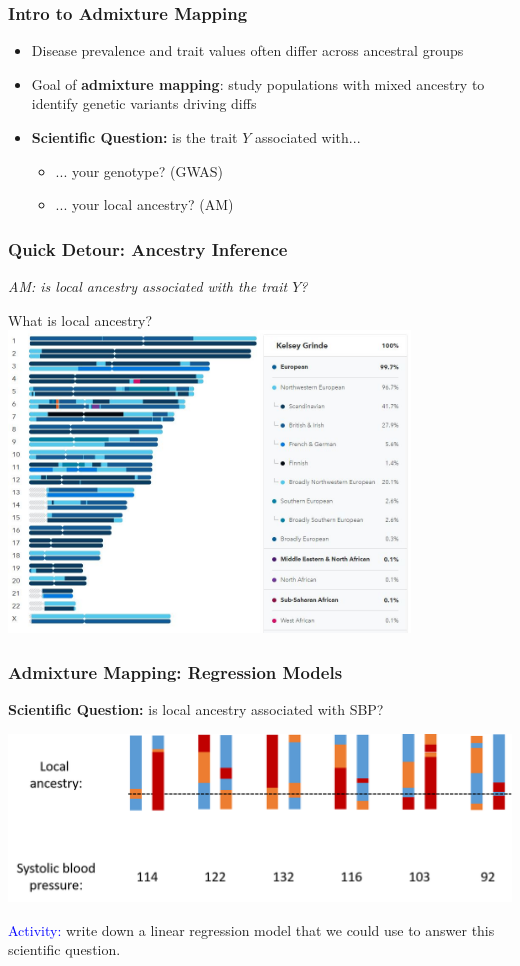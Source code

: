 \documentclass[12pt, 
hyperref={colorlinks=true, linkcolor=blue, urlcolor=cyan},dvipsnames]{beamer}
\begin{document}
\begin{frame}
\frametitle{Intro to Admixture Mapping}

\begin{itemize}
\item Disease prevalence and trait values often differ across ancestral groups
\item Goal of \textbf{admixture mapping}: study populations with mixed ancestry to identify genetic variants driving diffs
\item \textbf{Scientific Question:} is the trait $Y$ associated with...
	\begin{itemize}
	\item ... your genotype? (GWAS)
	\item ... your local ancestry? (AM)
	\end{itemize}
\end{itemize}

\end{frame}

\begin{frame}
\frametitle{Quick Detour: Ancestry Inference}
\centering

\textit{AM: is local ancestry associated with the trait $Y$?} \pause

What is local ancestry?
\includegraphics[width=0.8\textwidth]{figs/lai_example_23andMe}

\end{frame}


\begin{frame}
\frametitle{Admixture Mapping: Regression Models}

\textbf{Scientific Question:} is local ancestry associated with SBP?

\includegraphics[width=\textwidth]{figs/am_k3}

\textcolor{blue}{Activity:} write down a linear regression model that we could use to answer this scientific question.

\end{frame}
\end{document}
